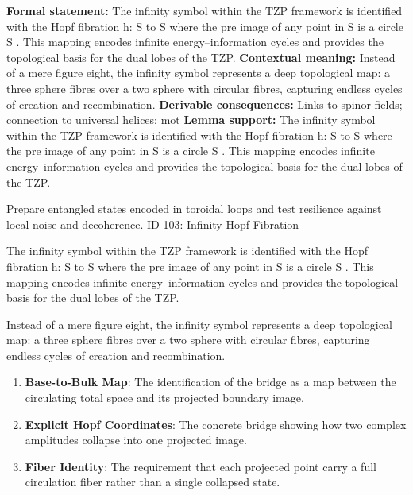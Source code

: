 \begingroup\footnotesize\setlength{\emergencystretch}{3em}\sloppy
\textbf{Formal statement:} The infinity symbol within the TZP framework is identified with the Hopf fibration h: S  to S  where the pre image of any point in S  is a circle S . This mapping encodes infinite energy--information cycles and provides the topological basis for the dual lobes of the TZP.
\textbf{Contextual meaning:} Instead of a mere figure eight, the infinity symbol represents a deep topological map: a three sphere fibres over a two sphere with circular fibres, capturing endless cycles of creation and recombination.
\textbf{Derivable consequences:} Links to spinor fields; connection to universal helices; mot
\textbf{Lemma support:} The infinity symbol within the TZP framework is identified with the Hopf fibration h: S  to S  where the pre image of any point in S  is a circle S . This mapping encodes infinite energy--information cycles and provides the topological basis for the dual lobes of the TZP.\par
\endgroup

Prepare entangled states encoded in toroidal loops and test resilience against local noise and decoherence. ID 103: Infinity Hopf Fibration

The infinity symbol within the TZP framework is identified with the Hopf fibration h: S  to S  where the pre image of any point in S  is a circle S . This mapping encodes infinite energy--information cycles and provides the topological basis for the dual lobes of the TZP.

Instead of a mere figure eight, the infinity symbol represents a deep topological map: a three sphere fibres over a two sphere with circular fibres, capturing endless cycles of creation and recombination.
\endgroup

\begin{enumerate}[leftmargin=1.6em,itemsep=6pt,topsep=4pt]
\item \textbf{Base-to-Bulk Map}: The identification of the bridge as a map between the circulating total space and its projected boundary image.
\item \textbf{Explicit Hopf Coordinates}: The concrete bridge showing how two complex amplitudes collapse into one projected image.
\item \textbf{Fiber Identity}: The requirement that each projected point carry a full circulation fiber rather than a single collapsed state.
\end{enumerate}

